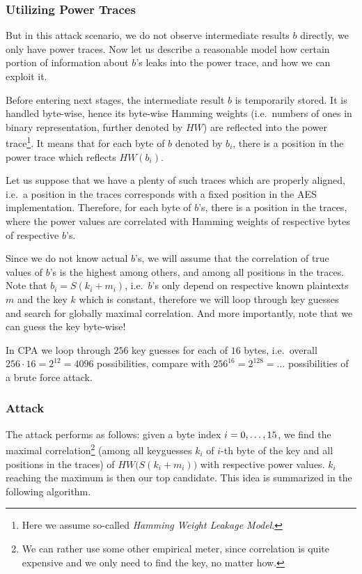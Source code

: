 \subsubsection{Utilizing Power Traces}
	
	But in this attack scenario, we do not observe intermediate results $b$ directly, we only have power traces. Now let us describe a reasonable model how certain portion of information about $b$'s leaks into the power trace, and how we can exploit it.
	
	Before entering next stages, the intermediate result $b$ is temporarily stored. It is handled byte-wise, hence its byte-wise Hamming weights (i.e.\ numbers of ones in binary representation, further denoted by $HW$) are reflected into the power trace\footnote{Here we assume so-called {\em Hamming Weight Leakage Model}.}. It means that for each byte of $b$ denoted by $b_i$, there is a position in the power trace which reflects $HW(b_i)$.
	
	Let us suppose that we have a plenty of such traces which are properly aligned, i.e.\ a position in the traces corresponds with a fixed position in the AES implementation. Therefore, for each byte of $b$'s, there is a position in the traces, where the power values are correlated with Hamming weights of respective bytes of respective $b$'s.
	
	Since we do not know actual $b$'s, we will assume that the correlation of true values of $b$'s is the highest among others, and among all positions in the traces. Note that $b_i = S(k_i+m_i)$, i.e.\ $b$'s only depend on respective known plaintexts $m$ and the key $k$ which is constant, therefore we will loop through key guesses and search for globally maximal correlation. And more importantly, note that we can guess the key byte-wise!
	
	\begin{note}
	\label{note:brutevssca}
		In CPA we loop through $256$ key guesses for each of $16$ bytes, i.e.\ overall $256\cdot 16 = 2^{12} = 4096$ possibilities, compare with $256^{16} = 2^{128} = \ldots$ possibilities of a brute force attack.
	\end{note}

\subsubsection{Attack}
	
	The attack performs as follows: given a byte index $i=0 , \ldots , 15$, we find the maximal correlation\footnote{We can rather use some other empirical meter, since correlation is quite expensive and we only need to find the key, no matter how.} (among all keyguesses $k_i$ of $i$-th byte of the key and all positions in the traces) of $HW\bigl(S(k_i+m_i)\bigr)$ with respective power values. $k_i$ reaching the maximum is then our top candidate. This idea is summarized in the following algorithm.
	
